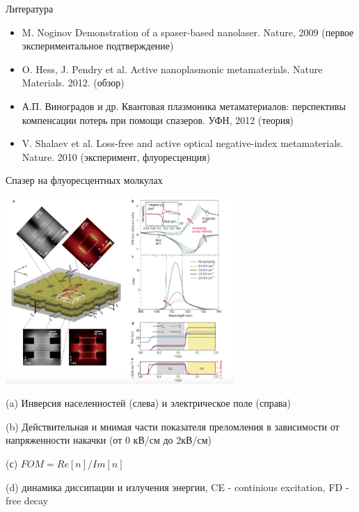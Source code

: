 \documentclass[9pt, compress, xcolor=table]{beamer}
\begin{document}
\begin{frame}{Литература}

\begin{itemize}
\item M. Noginov Demonstration of a spaser-based nanolaser. Nature, 2009 (первое экспериментальное подтверждение)
\item O. Hess, J. Pendry et al. Active nanoplasmonic metamaterials. Nature Materials. 2012. (обзор)
\item А.П. Виноградов и др. Квантовая плазмоника метаматериалов: перспективы компенсации потерь при помощи спазеров. УФН, 2012 (теория)
\item V. Shalaev et al. Loss-free and active optical negative-index metamaterials. Nature. 2010 (эксперимент, флуоресценция)
\end{itemize}



\end{frame}

\begin{frame}{Спазер на флуоресцентных молкулах}
\begin{center}
\includegraphics[width=0.65\textwidth]{am1}
\end{center}

{\small (a) Инверсия населенностей (слева) и электрическое поле (справа)

(b) Действительная и мнимая части показателя преломления в зависимости от напряженности накачки (от 0 кВ/см до 2кВ/см)

(с) $FOM=Re[n]/Im[n]$

(d) динамика диссипации и излучения энергии, CE - continious excitation, FD - free decay}
\end{frame}
\end{document}
